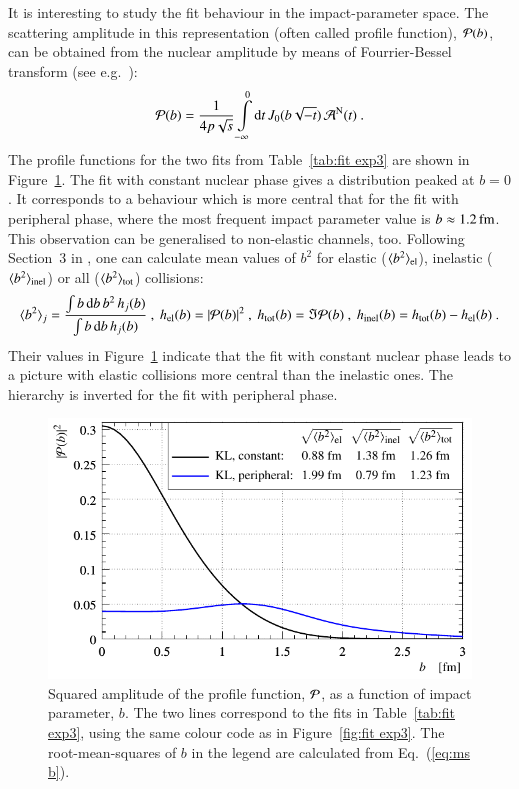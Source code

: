 It is interesting to study the fit behaviour in the impact-parameter space. The scattering amplitude in this representation (often called profile function), ${\cal P}(b)$, can be obtained from the nuclear amplitude by means of Fourrier-Bessel transform (see e.g.~\cite{klk02}):
\begin{equation}
\label{eq:prof fun}
	{\cal P}(b) = {1\over 4 p \sqrt s} \int\limits_{-\infty}^0 \d t\,J_0(b\sqrt{-t})\,{\cal A}^{\rm N}(t)\ .
\end{equation}
The profile functions for the two fits from Table~\ref{tab:fit exp3} are shown in Figure~\ref{fig:bdist exp3}. The fit with constant nuclear phase gives a distribution peaked at $b=0$. It corresponds to a behaviour which is more central that for the fit with peripheral phase, where the most frequent impact parameter value is $b\approx 1.2\,{\rm fm}$. This observation can be generalised to non-elastic channels, too. Following Section~3 in \cite{klk02}, one can calculate mean values of $b^2$ for elastic ($\langle b^2\rangle_{\rm el}$), inelastic ($\langle b^2\rangle_{\rm inel}$) or all ($\langle b^2\rangle_{\rm tot}$) collisions:
\begin{equation}
\label{eq:ms b}
	\langle b^2\rangle_j = {
		\int b\,\d b\,b^2\, h_j(b)
		\over
		\int b\,\d b\, h_j(b)
	}\ ,\ 
	h_{\rm el}(b) = |{\cal P}(b)|^2\ ,\ 
	h_{\rm tot}(b) = \Im {\cal P}(b)\ ,\ 
	h_{\rm inel}(b) = h_{\rm tot}(b) - h_{\rm el}(b)\ .
\end{equation}
Their values in Figure~\ref{fig:bdist exp3} indicate that the fit with constant nuclear phase leads to a picture with elastic collisions more central than the inelastic ones. The hierarchy is inverted for the fit with peripheral phase.



\begin{figure}
\begin{center}
\includegraphics{fig/fit_exp3/b_dist.pdf}
\caption{%
Squared amplitude of the profile function, ${\cal P}$, as a function of impact parameter, $b$. The two lines correspond to the fits in Table~\ref{tab:fit exp3}, using the same colour code as in Figure~\ref{fig:fit exp3}. The root-mean-squares of $b$ in the legend are calculated from Eq.~(\ref{eq:ms b}).
}%
\label{fig:bdist exp3}
\end{center}
\end{figure}


